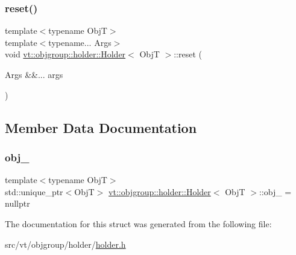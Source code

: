\subsubsection{\texorpdfstring{reset()}{reset()}}
{\footnotesize\ttfamily template$<$typename ObjT$>$ \\
template$<$typename... Args$>$ \\
void \hyperlink{structvt_1_1objgroup_1_1holder_1_1_holder}{vt\+::objgroup\+::holder\+::\+Holder}$<$ ObjT $>$\+::reset (\begin{DoxyParamCaption}\item[{Args \&\&...}]{args }\end{DoxyParamCaption})\hspace{0.3cm}{\ttfamily [inline]}}



\subsection{Member Data Documentation}
\mbox{\label{structvt_1_1objgroup_1_1holder_1_1_holder_a098ec3be989e0d95a1ad8d1a31db3eb2}} 
\subsubsection{\texorpdfstring{obj\+\_\+}{obj\_}}
{\footnotesize\ttfamily template$<$typename ObjT$>$ \\
std\+::unique\+\_\+ptr$<$ObjT$>$ \hyperlink{structvt_1_1objgroup_1_1holder_1_1_holder}{vt\+::objgroup\+::holder\+::\+Holder}$<$ ObjT $>$\+::obj\+\_\+ = nullptr\hspace{0.3cm}{\ttfamily [private]}}



The documentation for this struct was generated from the following file\+:\begin{DoxyCompactItemize}
\item 
src/vt/objgroup/holder/\hyperlink{objgroup_2holder_2holder_8h}{holder.\+h}\end{DoxyCompactItemize}
